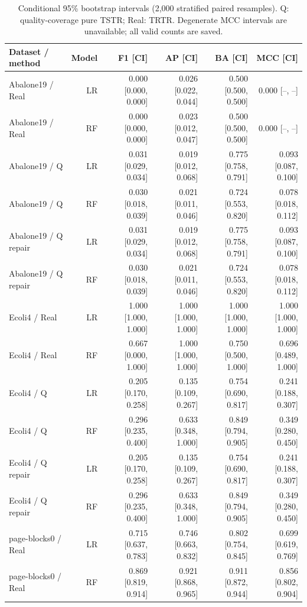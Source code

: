 \begin{table}[!t]
\centering
\caption{Conditional 95\% bootstrap intervals (2,000 stratified paired resamples). Q: quality-coverage pure TSTR; Real: TRTR. Degenerate MCC intervals are unavailable; all valid counts are saved.}\label{tab:bootstrap}
\footnotesize\setlength{\tabcolsep}{4pt}
\begin{tabular}{lrrrrr}
\toprule
Dataset / method & Model & F1 [CI] & AP [CI] & BA [CI] & MCC [CI] \\
\midrule
Abalone19 / Real & LR & 0.000 [0.000, 0.000] & 0.026 [0.022, 0.044] & 0.500 [0.500, 0.500] & 0.000 [--, --] \\
Abalone19 / Real & RF & 0.000 [0.000, 0.000] & 0.023 [0.012, 0.047] & 0.500 [0.500, 0.500] & 0.000 [--, --] \\
Abalone19 / Q & LR & 0.031 [0.029, 0.034] & 0.019 [0.012, 0.068] & 0.775 [0.758, 0.791] & 0.093 [0.087, 0.100] \\
Abalone19 / Q & RF & 0.030 [0.018, 0.039] & 0.021 [0.011, 0.046] & 0.724 [0.553, 0.820] & 0.078 [0.018, 0.112] \\
Abalone19 / Q repair & LR & 0.031 [0.029, 0.034] & 0.019 [0.012, 0.068] & 0.775 [0.758, 0.791] & 0.093 [0.087, 0.100] \\
Abalone19 / Q repair & RF & 0.030 [0.018, 0.039] & 0.021 [0.011, 0.046] & 0.724 [0.553, 0.820] & 0.078 [0.018, 0.112] \\
Ecoli4 / Real & LR & 1.000 [1.000, 1.000] & 1.000 [1.000, 1.000] & 1.000 [1.000, 1.000] & 1.000 [1.000, 1.000] \\
Ecoli4 / Real & RF & 0.667 [0.000, 1.000] & 1.000 [1.000, 1.000] & 0.750 [0.500, 1.000] & 0.696 [0.489, 1.000] \\
Ecoli4 / Q & LR & 0.205 [0.170, 0.258] & 0.135 [0.109, 0.267] & 0.754 [0.690, 0.817] & 0.241 [0.188, 0.307] \\
Ecoli4 / Q & RF & 0.296 [0.235, 0.400] & 0.633 [0.348, 1.000] & 0.849 [0.794, 0.905] & 0.349 [0.280, 0.450] \\
Ecoli4 / Q repair & LR & 0.205 [0.170, 0.258] & 0.135 [0.109, 0.267] & 0.754 [0.690, 0.817] & 0.241 [0.188, 0.307] \\
Ecoli4 / Q repair & RF & 0.296 [0.235, 0.400] & 0.633 [0.348, 1.000] & 0.849 [0.794, 0.905] & 0.349 [0.280, 0.450] \\
page-blocks0 / Real & LR & 0.715 [0.637, 0.783] & 0.746 [0.663, 0.832] & 0.802 [0.754, 0.845] & 0.699 [0.619, 0.769] \\
page-blocks0 / Real & RF & 0.869 [0.819, 0.914] & 0.921 [0.868, 0.965] & 0.911 [0.872, 0.944] & 0.856 [0.802, 0.904] \\

\end{tabular}
\end{table}
